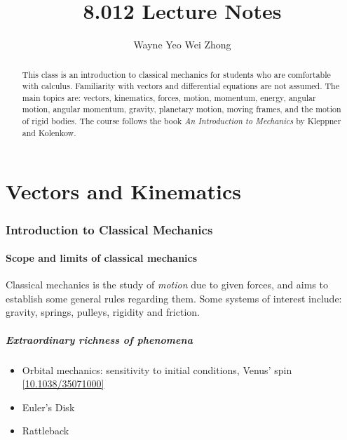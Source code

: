 \documentclass{article}
\title{8.012 Lecture Notes}
\author{Wayne Yeo Wei Zhong}
\numberwithin{theorem}{section}
\numberwithin{corollary}{section}
\numberwithin{postulate}{section}
\numberwithin{lemma}{section}
\theoremstyle{definition}
\numberwithin{definition}{section}
\theoremstyle{remark}
\begin{document}
\maketitle

\begin{abstract}
  This class is an introduction to classical mechanics for students who are
  comfortable with calculus. Familiarity with vectors and differential equations
  are not assumed. The main topics are:
  vectors, kinematics, forces, motion, momentum, energy, angular motion, angular
  momentum, gravity, planetary motion, moving frames, and the motion of rigid
  bodies. The course follows the book \emph{An Introduction to Mechanics} by
  Kleppner and Kolenkow.
\end{abstract}
\tableofcontents
\newpage

\part{Vectors and Kinematics}

\setcounter{section}{0}

\section{Introduction to Classical Mechanics}

\subsection{Scope and limits of classical mechanics}

Classical mechanics is the study of \emph{motion} due to given forces, and aims
to establish some general rules regarding them. Some systems of interest
include: gravity, springs, pulleys, rigidity and friction.

\subsubsection{Extraordinary richness of phenomena}

\begin{itemize}
  \item Orbital mechanics: sensitivity to initial conditions, Venus' spin
    \href{https://www.nature.com/articles/35071000}{[10.1038/35071000]}
  \item Euler's Disk
  \item Rattleback
\end{itemize}
\end{document}
